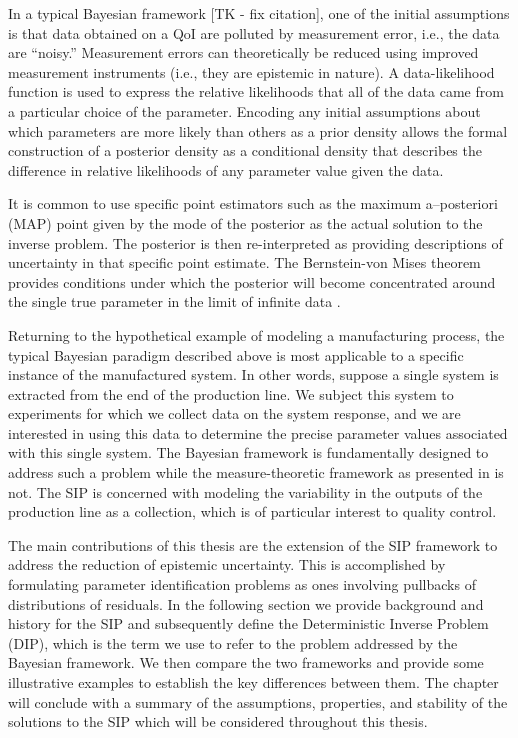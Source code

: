 In a typical Bayesian framework [TK - fix citation]\cite{0266-5611-7-5-003,
  Kennedy_O_JRSSSB_2001, Tarantola_book, MNR07, CDS10, starktenorio,
  AlexanderianPetraStadlerEtAl14, Bui-ThanhGhattas14, Ernst2014,
  0266-5611-30-11-110301, ROM:CMW_2016, Stuart10,
  cockayneoatessullivangirolami}, one of the initial assumptions is that data obtained on a QoI are polluted by measurement error, i.e., the data are ``noisy.''
  Measurement errors can theoretically be reduced using improved measurement instruments (i.e., they are epistemic in nature).
  A data-likelihood function is used to express the relative likelihoods that all of the data came from a particular choice of the parameter.
  Encoding any initial assumptions about which parameters are more likely than others as a prior density allows the formal construction of a posterior density as a conditional density that describes the difference in relative likelihoods of any parameter value given the data.

It is common to use specific point estimators such as the maximum a--posteriori (MAP) point given by the mode of the posterior as the actual solution to the inverse problem.
The posterior is then re-interpreted as providing descriptions of uncertainty in that specific point estimate.
The Bernstein-von Mises theorem \cite{vonmises} provides conditions under which the posterior will become concentrated around the single true parameter in the limit of infinite data \cite{Smith}.

Returning to the hypothetical example of modeling a manufacturing process, the typical Bayesian paradigm described above is most applicable to a specific instance of the manufactured system.
In other words, suppose a single system is extracted from the end of the production line.
We subject this system to experiments for which we collect data on the system response, and we are interested in using this data to determine the precise parameter values associated with this single system.
The Bayesian framework is fundamentally designed to address such a problem while the measure-theoretic framework as presented in \cite{BJW18a, BJW18b, BWY20} is not.
The SIP is concerned with modeling the variability in the outputs of the production line as a collection, which is of particular interest to quality control.

The main contributions of this thesis are the extension of the SIP framework to address the reduction of epistemic uncertainty.
This is accomplished by formulating parameter identification problems as ones involving pullbacks of distributions of residuals.
In the following section we provide background and history for the SIP and subsequently define the Deterministic Inverse Problem (DIP), which is the term we use to refer to the problem addressed by the Bayesian framework.
We then compare the two frameworks and provide some illustrative examples to establish the key differences between them.
The chapter will conclude with a summary of the assumptions, properties, and stability of the solutions to the SIP which will be considered throughout this thesis.

\FloatBarrier
